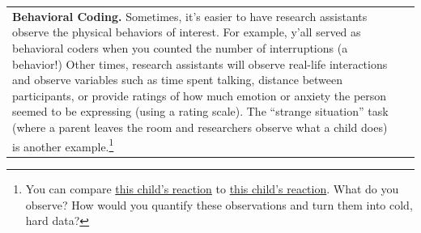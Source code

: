 \documentclass[
  letterpaper,
  DIV=11,
  numbers=noendperiod,
  oneside]{scrreprt}
\begin{document}
\begin{longtable}[]{@{}
  >{\raggedright\arraybackslash}p{}
  >{\raggedright\arraybackslash}p{}@{}}
\begin{minipage}[t]{\linewidth}
\textbf{Behavioral Coding.} Sometimes, it's easier to have research
assistants observe the physical behaviors of interest. For example,
y'all served as behavioral coders when you counted the number of
interruptions (a behavior!) Other times, research assistants will
observe real-life interactions and observe variables such as time spent
talking, distance between participants, or provide ratings of how much
emotion or anxiety the person seemed to be expressing (using a rating
scale). The ``strange situation'' task (where a parent leaves the room
and researchers observe what a child does) is another
example.\footnote{You can compare
  \href{https://www.youtube.com/watch?v=QquZxJhuSg8}{this child's
  reaction} to \href{https://www.youtube.com/watch?v=AGRT6VjnTm8}{this
  child's reaction}. What do you observe? How would you quantify these
  observations and turn them into cold, hard data?

  \hfill\break
}


\end{minipage}
\end{longtable}
\end{document}
